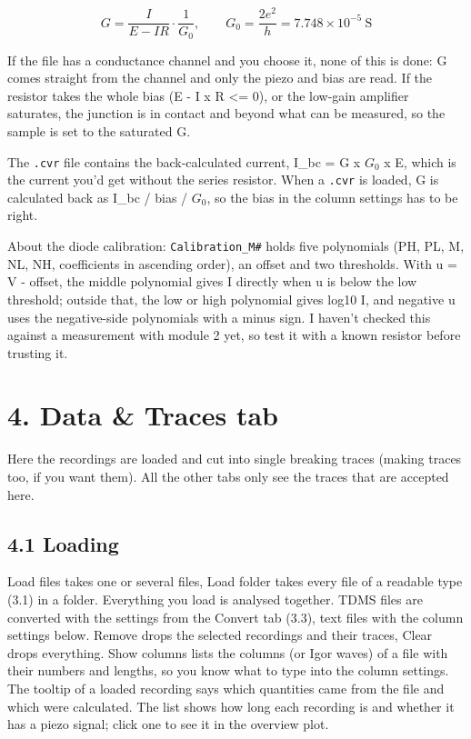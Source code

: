 \documentclass[
  11pt,
  a4paper,
]{article}
\begin{document}
\[
G = \frac{I}{E - I R} \cdot \frac{1}{G_0}, \qquad G_0 = \frac{2e^2}{h} = 7.748 \times 10^{-5}\ \mathrm{S}
\]

If the file has a conductance channel and you choose it, none of this is
done: G comes straight from the channel and only the piezo and bias are
read. If the resistor takes the whole bias (E - I x R \textless= 0), or
the low-gain amplifier saturates, the junction is in contact and beyond
what can be measured, so the sample is set to the saturated G.

The \texttt{.cvr} file contains the back-calculated current, I\_bc = G x
$G_0$ x E, which is the current you'd get without the series resistor.
When a \texttt{.cvr} is loaded, G is calculated back as I\_bc / bias /
$G_0$, so the bias in the column settings has to be right.

About the diode calibration: \texttt{Calibration\_\allowbreak{}M\#}
holds five polynomials (PH, PL, M, NL, NH, coefficients in ascending
order), an offset and two thresholds. With u = V - offset, the middle
polynomial gives I directly when \textbar u\textbar{} is below the low
threshold; outside that, the low or high polynomial gives log10
\textbar I\textbar, and negative u uses the negative-side polynomials
with a minus sign. I haven't checked this against a measurement with
module 2 yet, so test it with a known resistor before trusting it.

\hypertarget{data-traces-tab}{%
\section{4. Data \& Traces tab}\label{data-traces-tab}}

Here the recordings are loaded and cut into single breaking traces
(making traces too, if you want them). All the other tabs only see the
traces that are accepted here.

\hypertarget{loading}{%
\subsection{4.1 Loading}\label{loading}}

Load files takes one or several files, Load folder takes every file of a
readable type (3.1) in a folder. Everything you load is analysed
together. TDMS files are converted with the settings from the Convert
tab (3.3), text files with the column settings below. Remove drops the
selected recordings and their traces, Clear drops everything. Show
columns lists the columns (or Igor waves) of a file with their numbers
and lengths, so you know what to type into the column settings. The
tooltip of a loaded recording says which quantities came from the file
and which were calculated. The list shows how long each recording is and
whether it has a piezo signal; click one to see it in the overview plot.
\end{document}
